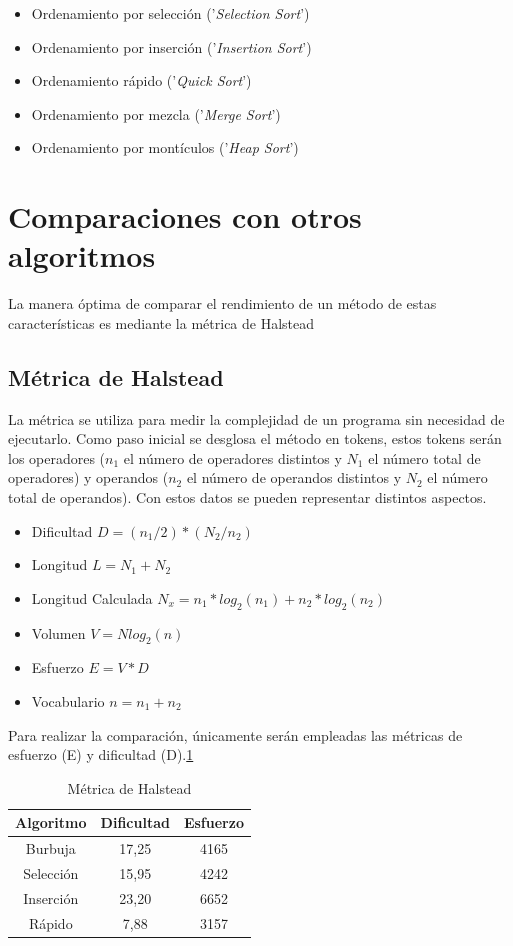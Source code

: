 \documentclass[conference, a4paper]{IEEEtran}
\begin{document}
\begin{itemize}
    \item Ordenamiento por selección ('\textit{Selection Sort}')
    \item Ordenamiento por inserción ('\textit{Insertion Sort}')
    \item Ordenamiento rápido ('\textit{Quick Sort}')
    \item Ordenamiento por mezcla ('\textit{Merge Sort}')
    \item Ordenamiento por montículos ('\textit{Heap Sort}')
\end{itemize}

\section{Comparaciones con otros algoritmos}

La manera óptima de comparar el rendimiento de un método de estas características es mediante la métrica de Halstead

\subsection{Métrica de Halstead}

La métrica se utiliza para medir la complejidad de un programa sin necesidad de ejecutarlo. Como paso inicial se desglosa el método en tokens, estos tokens serán los operadores (\(n_1\) el número de operadores distintos y \(N_1\) el número total de operadores) y operandos (\(n_2\) el número de operandos distintos y \(N_2\) el número total de operandos). Con estos datos se pueden representar distintos aspectos.\cite{geeksforgeeks_halstead_2025}\cite{schneider_halstead_2025}

\begin{itemize}
    \item Dificultad \(D = (n_1 / 2) * (N_2 / n_2)\)
    \item Longitud \(L = N_1 + N_2\)
    \item Longitud Calculada \(N_{x} = n_1 * log_2(n_1) + n_2 * log_2(n_2)\)
    \item Volumen \(V = N log_2(n)\)
    \item Esfuerzo \(E = V * D\)
    \item Vocabulario \(n = n_1 + n_2\)
\end{itemize}

Para realizar la comparación, únicamente serán empleadas las métricas de esfuerzo (E) y dificultad (D).\ref{tab:TabHalstead}\cite{owen_bubblesort}
\begin{table}[]
    \centering
    \begin{tabular}{|c|c|c|}\hline
         Algoritmo&  Dificultad &Esfuerzo \\\hline
         Burbuja&
     17,25&4165\\\hline
 Selección& 15,95&4242\\\hline
 Inserción& 23,20&6652\\\hline
 Rápido& 7,88&3157\\ \hline\end{tabular}
    \caption{Métrica de Halstead}
    \label{tab:TabHalstead}
\end{table}
\end{document}
